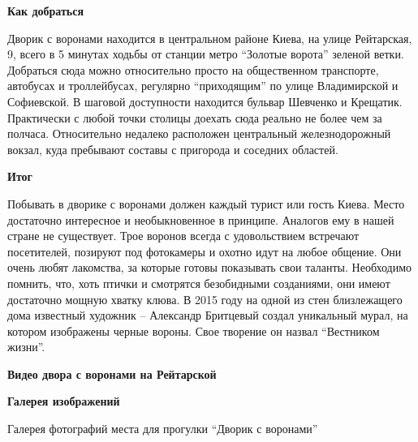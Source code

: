 \textbf{Как добраться} 

Дворик с воронами находится в центральном районе Киева, на улице Рейтарская, 9,
всего в 5 минутах ходьбы от станции метро \enquote{Золотые ворота} зеленой ветки.
Добраться сюда можно относительно просто на общественном транспорте, автобусах
и троллейбусах, регулярно \enquote{приходящим} по улице Владимирской и Софиевской. В
шаговой доступности находится бульвар Шевченко и Крещатик. Практически с любой
точки столицы доехать сюда реально не более чем за полчаса. Относительно
недалеко расположен центральный железнодорожный вокзал, куда пребывают составы
с пригорода и соседних областей.

\textbf{Итог}

Побывать в дворике с воронами должен каждый турист или гость Киева. Место
достаточно интересное и необыкновенное в принципе. Аналогов ему в нашей стране
не существует. Трое воронов всегда с удовольствием встречают посетителей,
позируют под фотокамеры и охотно идут на любое общение. Они очень любят
лакомства, за которые готовы показывать свои таланты. Необходимо помнить, что,
хоть птички и смотрятся безобидными созданиями, они имеют достаточно мощную
хватку клюва. В 2015 году на одной из стен близлежащего дома известный художник
– Александр Бритцевый создал уникальный мурал, на котором изображены черные
вороны. Свое творение он назвал \enquote{Вестником жизни}.

\textbf{Видео двора с воронами на Рейтарской}

\textbf{Галерея изображений}

Галерея фотографий места для прогулки \enquote{Дворик с воронами}

